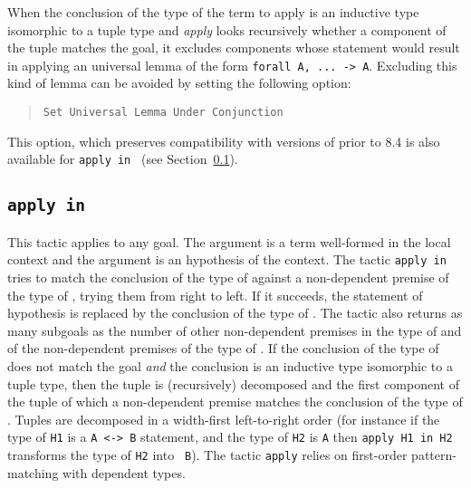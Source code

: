 \begin{coq_example*}
 When the conclusion of the type of the term
to apply is an inductive type isomorphic to a tuple type and {\em apply}
looks recursively whether a component of the tuple matches the goal,
it excludes components whose statement would result in applying an
universal lemma of the form {\tt forall A, ... -> A}. Excluding this
kind of lemma can be avoided by setting the following option:

\begin{quote}
{\tt Set Universal Lemma Under Conjunction}
\end{quote}

This option, which preserves compatibility with versions of {\Coq}
prior to 8.4 is also available for {\tt apply {\term} in {\ident}}
(see Section~\ref{apply-in}).

\subsection{\tt apply {\term} in {\ident}}
\label{apply-in}

This tactic applies to any goal.  The argument {\term} is a term
well-formed in the local context and the argument {\ident} is an
hypothesis of the context.  The tactic {\tt apply {\term} in {\ident}}
tries to match the conclusion of the type of {\ident} against a
non-dependent premise of the type of {\term}, trying them from right to
left.  If it succeeds, the statement of hypothesis {\ident} is
replaced by the conclusion of the type of {\term}. The tactic also
returns as many subgoals as the number of other non-dependent premises
in the type of {\term} and of the non-dependent premises of the type
of {\ident}.  If the conclusion of the type of {\term} does not match
the goal {\em and} the conclusion is an inductive type isomorphic to a
tuple type, then the tuple is (recursively) decomposed and the first
component of the tuple of which a non-dependent premise matches the
conclusion of the type of {\ident}. Tuples are decomposed in a
width-first left-to-right order (for instance if the type of {\tt H1}
is a \verb=A <-> B= statement, and the type of {\tt H2} is \verb=A=
then {\tt apply H1 in H2} transforms the type of {\tt H2} into {\tt
  B}). The tactic {\tt apply} relies on first-order pattern-matching
with dependent types.

\begin{ErrMsgs}
\item {}


\end{ErrMsgs}
\end{coq_example*}
